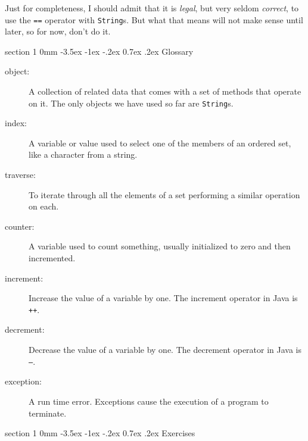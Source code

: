 \documentclass{book}
\makeatletter
\renewcommand{\section}{\@startsection 
    {section} {1} {0mm}%
    {-3.5ex \@plus -1ex \@minus -.2ex}%
    {0.7ex \@plus.2ex}%
    {\normalfont\Large\bfseries}}
\makeatother
\begin{document}
Just for completeness, I should admit that it is
{\em legal}, but very seldom {\em correct}, to use the {\tt ==}
operator with {\tt String}s.  But what that means will not make
sense until later, so for now, don't do it.

\section{Glossary}

\begin{description}

\item[object:] A collection of related data that comes with a set of
methods that operate on it.  The only objects we have used so far are
{\tt String}s.

\item[index:]  A variable or value used to select one of the
members of an ordered set, like a character from a string.

\item[traverse:]  To iterate through all the elements of a set
performing a similar operation on each.

\item[counter:]  A variable used to count something, usually
initialized to zero and then incremented.

\item[increment:]  Increase the value of a variable by one.
The increment operator in Java is {\tt ++}.

\item[decrement:]  Decrease the value of a variable by one.
The decrement operator in Java is {\tt --}.

\item[exception:]  A run time error.  Exceptions cause the execution
of a program to terminate.


\end{description}


\section{Exercises}
\end{document}
